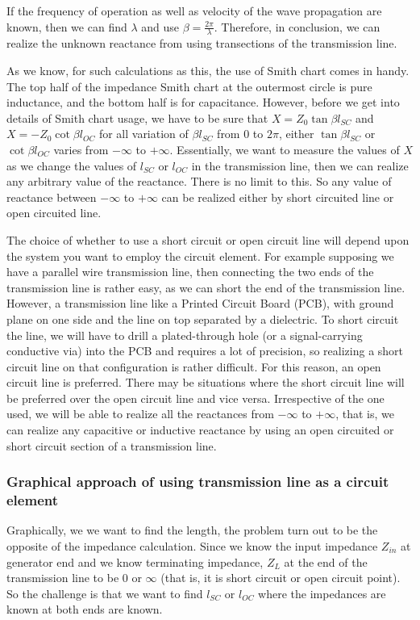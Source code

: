 If the frequency of operation as well as velocity of the wave propagation are known, then we can find $\lambda$ and use $\beta = \frac{2\pi}{\lambda} $. Therefore, in conclusion, we can realize the unknown reactance from using transections of the transmission line. 

As we know, for such calculations as this, the use of Smith chart comes in handy. The top half of the impedance Smith chart at the outermost circle is pure inductance, and the bottom half is for capacitance. However, before we get into details of Smith chart usage, we have to be sure that $X = Z_0\tan\beta l_{SC}$ and $X = -Z_0\cot\beta l_{OC}$ for all variation of $\beta l_{SC}$  from 0 to $ 2\pi $, either $\tan\beta l_{SC}$ or $\cot\beta l_{OC}$ varies from $-\infty$ to $+\infty$. Essentially, we want to measure the values of $X$ as we change the values of $l_{SC}$ or $l_{OC}$ in the transmission line, then we can realize any arbitrary value of the reactance. There is no limit to this. So any value of reactance between $-\infty$ to $+\infty$ can be realized either by short circuited line or open circuited line.

The choice of whether to use a short circuit or open circuit line will depend upon the system you want to employ the circuit element. For example supposing we have a parallel wire transmission line, then connecting the two ends of the transmission line is rather easy, as we can short the end of the transmission line. However, a transmission line like a Printed Circuit Board (PCB), with ground plane on one side and the line on top separated by a dielectric. To short circuit the line, we will have to drill a plated-through hole (or a signal-carrying conductive via) into the PCB and requires a lot of precision, so realizing a short circuit line on that configuration is rather difficult. For this reason, an open circuit line is preferred. There may be situations where the short circuit line will be preferred over the open circuit line and vice versa. Irrespective of the one used, we will be able to realize all the reactances from  $ -\infty$ to $+\infty $, that is, we can realize any capacitive or inductive reactance by using an open circuited or short circuit section of a transmission line.

\subsubsection{Graphical approach of using transmission line as a circuit element}
Graphically, we we want to find the length, the problem turn out to be the opposite of the impedance calculation. Since we know the input impedance $Z_{in}$ at generator end  and we know terminating impedance, $Z_{L}$ at the end of the transmission line to be 0 or $\infty$ (that is, it is short circuit or open circuit point). So the challenge is that we want to find $ l_{SC} $ or $ l_{OC} $ where the impedances are known at both ends are known.

